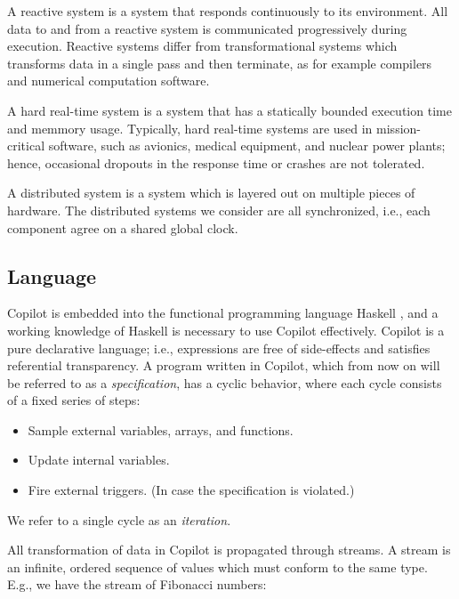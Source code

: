 \documentclass[]{article}
\theoremstyle{example}
\begin{document}
A reactive system is a system that responds continuously to its environment.
All data to and from a reactive system is communicated progressively during
execution. Reactive systems differ from transformational systems which transforms
data in a single pass and then terminate, as for example compilers and numerical
computation software.

A hard real-time system is a system that has a statically bounded execution time
and memmory usage.  Typically, hard real-time systems are used in
mission-critical software, such as avionics, medical equipment, and nuclear power
plants; hence, occasional dropouts in the response time or crashes are not
tolerated.

A distributed system is a system which is layered out on multiple pieces of hardware.
The distributed systems we consider are all synchronized, i.e., each component agree on
a shared global clock.


\subsection{Language} 
\label{sec:language}

Copilot is embedded into the functional programming language Haskell
\cite{PeytonJones02}, and a working knowledge of Haskell is necessary to use
Copilot effectively. Copilot is a pure declarative language; i.e., expressions
are free of side-effects and satisfies referential transparency.  A program
written in Copilot, which from now on will be referred to as a
\emph{specification}, has a cyclic behavior, where each cycle consists of a
fixed series of steps:

\begin{itemize}
\item Sample external variables, arrays, and functions.
\item Update internal variables.
\item Fire external triggers. (In case the specification is violated.)
\end{itemize}

\noindent We refer to a single cycle as an \emph{iteration}.

All transformation of data in Copilot is propagated through streams.
A stream is an infinite, ordered sequence of values which must conform to the same type.
E.g., we have the stream of Fibonacci numbers:
\end{document}
